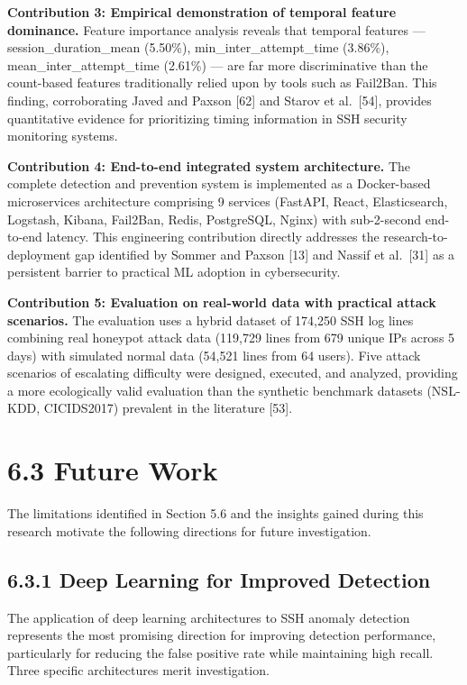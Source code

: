 \documentclass[
  a4paper]{report}
\begin{document}
\textbf{Contribution 3: Empirical demonstration of temporal feature
dominance.} Feature importance analysis reveals that temporal features
--- session\_duration\_mean (5.50\%), min\_inter\_attempt\_time
(3.86\%), mean\_inter\_attempt\_time (2.61\%) --- are far more
discriminative than the count-based features traditionally relied upon
by tools such as Fail2Ban. This finding, corroborating Javed and Paxson
{[}62{]} and Starov et al.~{[}54{]}, provides quantitative evidence for
prioritizing timing information in SSH security monitoring systems.

\textbf{Contribution 4: End-to-end integrated system architecture.} The
complete detection and prevention system is implemented as a
Docker-based microservices architecture comprising 9 services (FastAPI,
React, Elasticsearch, Logstash, Kibana, Fail2Ban, Redis, PostgreSQL,
Nginx) with sub-2-second end-to-end latency. This engineering
contribution directly addresses the research-to-deployment gap
identified by Sommer and Paxson {[}13{]} and Nassif et al.~{[}31{]} as a
persistent barrier to practical ML adoption in cybersecurity.

\textbf{Contribution 5: Evaluation on real-world data with practical
attack scenarios.} The evaluation uses a hybrid dataset of 174,250 SSH
log lines combining real honeypot attack data (119,729 lines from 679
unique IPs across 5 days) with simulated normal data (54,521 lines from
64 users). Five attack scenarios of escalating difficulty were designed,
executed, and analyzed, providing a more ecologically valid evaluation
than the synthetic benchmark datasets (NSL-KDD, CICIDS2017) prevalent in
the literature {[}53{]}.

\section{6.3 Future Work}\label{future-work}

The limitations identified in Section 5.6 and the insights gained during
this research motivate the following directions for future
investigation.

\subsection{6.3.1 Deep Learning for Improved
Detection}\label{deep-learning-for-improved-detection}

The application of deep learning architectures to SSH anomaly detection
represents the most promising direction for improving detection
performance, particularly for reducing the false positive rate while
maintaining high recall. Three specific architectures merit
investigation.
\end{document}
